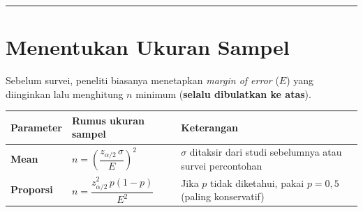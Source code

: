 \documentclass[
  indonesian,
  letterpaper,
]{book}
\newcounter{none} %
\begin{document}
\begin{center}\rule{0.5\linewidth}{0.5pt}\end{center}

\section{Menentukan Ukuran Sampel}\label{menentukan-ukuran-sampel}

Sebelum survei, peneliti biasanya menetapkan \emph{margin of error}
(\(E\)) yang diinginkan lalu menghitung \(n\) minimum (\textbf{selalu
dibulatkan ke atas}).

{\def\LTcaptype{none} %
\begin{longtable}[]{@{}
  >{\raggedright\arraybackslash}p{}
  >{\raggedright\arraybackslash}p{}
  >{\raggedright\arraybackslash}p{}@{}}
\toprule\noalign{}
\begin{minipage}[b]{\linewidth}\raggedright
Parameter
\end{minipage} & \begin{minipage}[b]{\linewidth}\raggedright
Rumus ukuran sampel
\end{minipage} & \begin{minipage}[b]{\linewidth}\raggedright
Keterangan
\end{minipage} \\
\midrule\noalign{}
\endhead
\bottomrule\noalign{}
\endlastfoot
\textbf{Mean} & \(n = \left(\dfrac{z_{\alpha/2}\,\sigma}{E}\right)^2\) &
\(\sigma\) ditaksir dari studi sebelumnya atau survei percontohan \\
\textbf{Proporsi} & \(n = \dfrac{z_{\alpha/2}^2\,p(1-p)}{E^2}\) & Jika
\(p\) tidak diketahui, pakai \(p = 0{,}5\) (paling konservatif) \\
\end{longtable}
}
\end{document}
